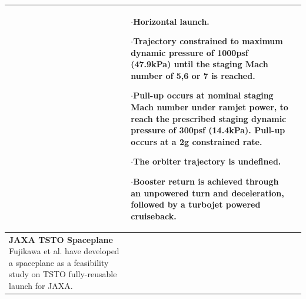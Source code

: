 {\begin{landscape}
\begin{xltabular}{\linewidth}{|X|X|X|}
	
	&\small
	
	$\cdot$Horizontal launch.
	
	$\cdot$Trajectory constrained to maximum dynamic pressure of 1000psf (47.9kPa) until the staging Mach number of 5,6 or 7 is reached. 
	
	$\cdot$Pull-up occurs at nominal staging Mach number under ramjet power, to reach the prescribed staging dynamic pressure of 300psf (14.4kPa). Pull-up occurs at a 2g constrained rate. 
	
	$\cdot$The orbiter trajectory is undefined.
	
	$\cdot$Booster return is achieved through an unpowered turn and deceleration, followed by a turbojet powered cruiseback. 
	\\
	
	
	\hline \small 
	\textbf{JAXA TSTO Spaceplane}\cite{Fujikawa2017}\newline\newline
	Fujikawa et al.\cite{Fujikawa2017} have developed a spaceplane as a feasibility study on TSTO fully-reusable launch for JAXA. 
	
	&\small
	

\end{xltabular}
\end{landscape}}

